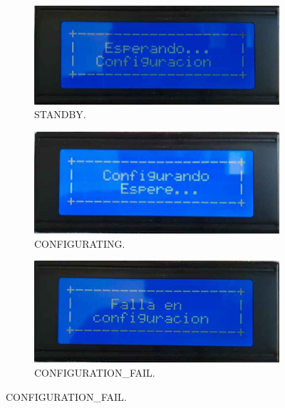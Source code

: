 \begin{figure}[!htpb]
     \centering
     \begin{subfigure}[b]{0.4\textwidth}
         \centering
         \includegraphics[width=1.1\textwidth]{./Figures/Esp_Conf.jpeg}
         \caption{STANDBY.}
         \label{fig:pruConf_6_1}
     \end{subfigure}
           \hfill
     \begin{subfigure}[b]{0.4\textwidth}
         \centering
         \includegraphics[width=1.1\textwidth]{./Figures/Conf_esp.jpeg}
         \caption{CONFIGURATING.}
         \label{fig:pruConf_6_2}
     \end{subfigure}
           \hfill
     \begin{subfigure}[b]{0.4\textwidth}
         \centering
         \includegraphics[width=1.1\textwidth]{./Figures/Falla_conf.jpeg}
         \caption{CONFIGURATION\_FAIL.}
         \label{fig:pruConf_6_3}

\end{subfigure}
\end{figure}
